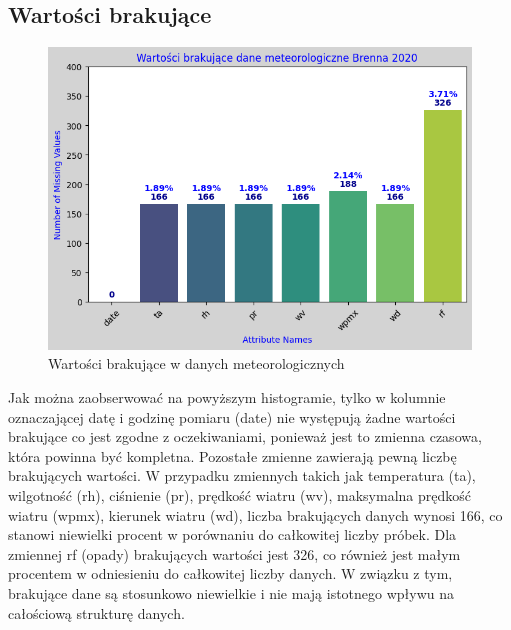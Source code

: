 \documentclass[10pt,a4paper]{article}
\begin{document}
\subsection*{Wartości brakujące}

\begin{figure}[H]
	\centering
	\includegraphics[scale=0.7]{missing_values.png}
	\caption{Wartości brakujące w danych meteorologicznych}
	\label{fig:my_label}
\end{figure}

Jak można zaobserwować na powyższym histogramie, tylko w kolumnie oznaczającej datę i godzinę pomiaru (date) nie występują żadne wartości brakujące co jest zgodne z oczekiwaniami, ponieważ jest to zmienna czasowa, która powinna być kompletna. Pozostałe zmienne zawierają pewną liczbę brakujących wartości.
W przypadku zmiennych takich jak temperatura (ta), wilgotność (rh), ciśnienie (pr), prędkość wiatru (wv), maksymalna prędkość wiatru (wpmx), kierunek wiatru (wd), liczba brakujących danych wynosi 166, co stanowi niewielki procent w porównaniu do całkowitej liczby próbek. Dla zmiennej rf (opady) brakujących wartości jest 326, co również jest małym procentem w odniesieniu do całkowitej liczby danych. W związku z tym, brakujące dane są stosunkowo niewielkie i nie mają istotnego wpływu na całościową strukturę danych.
\end{document}
